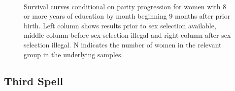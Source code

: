 \documentclass[12pt,letterpaper]{article}
\begin{document}
\begin{figure}[htpb]
{\begin{minipage}{0.31\textwidth}
        \captionsetup[subfigure]{labelformat=parens}
    \end{minipage}
} \\
\setcounter{subfigure}{5}
\setcounter{subfigure}{6}
\caption{Survival curves conditional on parity progression
for women with 8 or more years of education by month beginning 9 months after prior birth.
Left column shows results prior to sex selection available, middle column before
sex selection illegal and right column after sex selection illegal.
N indicates the number of women in the relevant group in the underlying samples.
}
\label{fig:results_spell2_high_pps}
\end{figure}


\clearpage
\newpage

\subsection{Third Spell}



\end{document}
